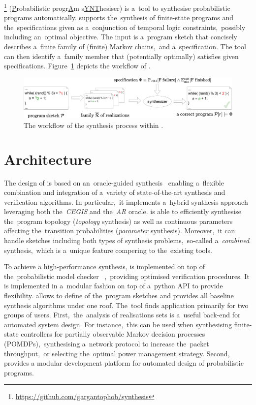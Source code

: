 \toolname{}\footnote{\url{https://github.com/gargantophob/synthesis}} (\underline{P}robabilistic progr\underline{A}m s\underline{YNT}hesiser) is a~tool to synthesise probabilistic programs automatically.
\toolname{} supports the~synthesis of finite-state programs and the~specifications given as a~conjunction of temporal logic constraints,~possibly including an~optimal objective.
The input is a~program sketch that concisely describes a~finite family of (finite) Markov chains,~and a~specification.
The tool can then identify a~family member that (potentially optimally) satisfies given specifications.
Figure~\ref{fig:sketching} depicts the workflow of \toolname{}.

\begin{figure}[h!]
\centering
\includegraphics[width=1.0\textwidth]{figures/sketching}
\caption{The workflow of the synthesis process within \toolname{}.}%
\label{fig:sketching}%
\end{figure}

\section{Architecture}

The design of \toolname{} is based on an~oracle-guided synthesis~\cite{tacas21} enabling a~flexible combination and integration of a~variety of state-of-the-art synthesis and verification algorithms. 
In particular,~it implements a~hybrid synthesis approach leveraging both the~\emph{CEGIS} and the~\emph{AR} oracle. 
\toolname{} is able to efficiently synthesise the~program topology (\emph{topology} synthesis) as well as continuous parameters affecting the~transition probabilities (\emph{parameter} synthesis).
Moreover,~it can handle sketches including both types of synthesis problems,~so-called a~\emph{combined} synthesis,~which is a~unique feature compering to the~existing tools. 

To achieve a high-performance synthesis, \toolname{} is implemented on top of the~probabilistic model chec\-ker \storm{}~\cite{STORM},~providing optimised verification procedures.
It is implemented in a~modular fashion on top of a~python API to provide flexibility.
\toolname{} allows to define of the~program sketches and provides all baseline synthesis algorithms under one roof.
The~tool finds application primarily for two groups of users.
First,~the~analysis of realisations sets is a~useful back-end for automated system design. %
For instance,~this can be used when synthesising finite-state controllers for partially observable Markov decision processes (POMDPs),~synthesising a~network protocol to increase the~packet throughput,~or selecting the~optimal power management strategy.
Second,~\toolname{} provides a modular development platform for automated design of probabilistic programs.

